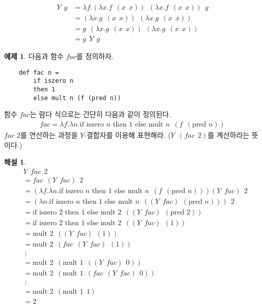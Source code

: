 \documentclass[b5paper, 11pt]{book}
\theoremstyle{definition}
\newtheorem{ex}[defn]{예제}
\newtheorem*{ans*}{해설}
\newenvironment{pf*}{\pushQED{\qed}\pf}
{\popQED\endpf}
\begin{document}
\begin{pf*}
    \begin{align*}
        Y \;\, g &= \lambda f.(\lambda x. f \;\, (x\;\, x)) \;\, (\lambda x. f \;\, (x \;\, x)) \;\, g \\
        &= (\lambda x. g \;\, (x \;\, x)) \;\, (\lambda x .g \;\, (x \;\, x)) \\ 
        &= g \;\,  (\lambda x. g \;\, (x \;\, x)) \;\, (\lambda x .g \;\, (x \;\, x))  \\ 
        &= g \;\, Y \;\, g
    \end{align*}
\end{pf*}
\begin{ex}
    다음과 함수 $fac$를 정의하자.
    \begin{lstlisting}
    def fac n =
        if iszero n 
        then 1 
        else mult n (f (pred n))
    \end{lstlisting}
    함수 $fac$는 람다 식으로는 간단히 다음과 같이 정의된다.
    \begin{align*}
        fac = \lambda f. \lambda n. \text{if } \text{iszero } n \text{ then }
        1 \text{ else } \text{mult } n \;\, (f \;\, (\text{pred } n))
    \end{align*}
    $fac$ 2를 연산하는 과정을 $Y$-결합자를 이용해 표현해라. ($Y \;\, (fac \;\, 2)$를 계산하라는 뜻이다.)
\end{ex}
\begin{ans*}
    \begin{align*}
        &Y \;\, fac \;\, 2 \\ 
        &= fac \;\, (Y \;\, fac) \;\, 2 \\ 
        &= (\lambda f. \lambda n. \text{if } \text{iszero } n \text{ then }
        1 \text{ else } \text{mult } n \;\, (f \;\, (\text{pred } n))) (Y \;\, fac) \;\, 2 \\
        &= (\lambda n. \text{if } \text{iszero } n \text{ then }
        1 \text{ else } \text{mult } n \;\, ((Y \;\, fac) \;\, (\text{pred } n))) \;\, 2 \\
        &=   \text{if } \text{iszero } 2 \text{ then }
        1 \text{ else } \text{mult } 2 \;\, ((Y \;\, fac) \;\, (\text{pred } 2))\\
        &=  \text{if } \text{iszero } 2 \text{ then }
        1 \text{ else } \text{mult } 2 \;\, ((Y \;\, fac) \;\, (1)) \\ 
        &= \text{mult } 2 \;\, ((Y \;\, fac) \;\, (1)) \\
        &= \text{mult } 2 \;\, (fac \;\, (Y \;\, fac) \;\, (1)) \\ 
        &\; \vdots \\ 
        &= \text{mult } 2 \;\, (\text{mult } 1 \;\, ((Y \;\, fac) \;\, 0)) \\
        &= \text{mult } 2 \;\, (\text{mult } 1 \;\, (fac \;\, (Y \;\, fac) \;\, 0)) \\ 
        &\; \vdots \\ 
        &= \text{mult } 2 \;\, (\text{mult } 1 \;\, 1) \\
        &= 2 
    \end{align*}
\end{ans*}
\end{document}
